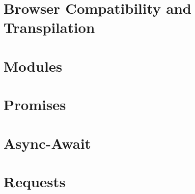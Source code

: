 \documentclass[11pt]{article}
\begin{document}
\newpage
\section{Browser Compatibility and Transpilation}
\newpage
\section{Modules}
\newpage
\section{Promises}
\newpage
\section{Async-Await}
\newpage
\section{Requests}
\end{document}

